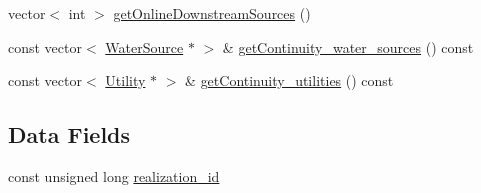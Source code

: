\begin{DoxyCompactItemize}
\item 
vector$<$ int $>$ \mbox{\hyperlink{classContinuityModel_a609fa24135a600af177d1460e0162014_a609fa24135a600af177d1460e0162014}{get\+Online\+Downstream\+Sources}} ()
\item 
const vector$<$ \mbox{\hyperlink{classWaterSource}{Water\+Source}} $\ast$ $>$ \& \mbox{\hyperlink{classContinuityModel_ae0dec8510ab216accd44097e5a366bd8_ae0dec8510ab216accd44097e5a366bd8}{get\+Continuity\+\_\+water\+\_\+sources}} () const
\item 
const vector$<$ \mbox{\hyperlink{classUtility}{Utility}} $\ast$ $>$ \& \mbox{\hyperlink{classContinuityModel_a922c1dea6e49d67c87a7fbb34c7bc623_a922c1dea6e49d67c87a7fbb34c7bc623}{get\+Continuity\+\_\+utilities}} () const
\end{DoxyCompactItemize}
\subsection*{Data Fields}
\begin{DoxyCompactItemize}
\item 
const unsigned long \mbox{\hyperlink{classContinuityModel_a7b6c99bf256f6c6b633ebb78282f43c7_a7b6c99bf256f6c6b633ebb78282f43c7}{realization\+\_\+id}}
\end{DoxyCompactItemize}
